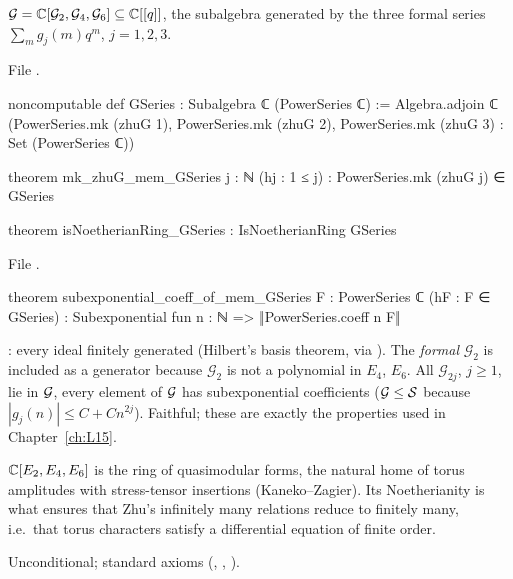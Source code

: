 \begin{definition}\label{l14:def:GSeries}
$\mathcal{G} = {\mathbb{C}}[\mathcal G_2,\mathcal G_4,\mathcal G_6]\subseteq{\mathbb{C}}[[q]]$, the subalgebra generated by the three formal
series $\sum_mg_j(m)q^m$, $j=1,2,3$.
\end{definition}
\noindent File .
\begin{leancode}
noncomputable def GSeries : Subalgebra ℂ (PowerSeries ℂ) :=
  Algebra.adjoin ℂ ({PowerSeries.mk (zhuG 1), PowerSeries.mk (zhuG 2),
    PowerSeries.mk (zhuG 3)} : Set (PowerSeries ℂ))

theorem mk_zhuG_mem_GSeries {j : ℕ} (hj : 1 ≤ j) :
    PowerSeries.mk (zhuG j) ∈ GSeries

theorem isNoetherianRing_GSeries : IsNoetherianRing GSeries
\end{leancode}
\noindent File .
\begin{leancode}
theorem subexponential_coeff_of_mem_GSeries {F : PowerSeries ℂ} (hF : F ∈ GSeries) :
    Subexponential fun n : ℕ => ‖PowerSeries.coeff n F‖
\end{leancode}
\begin{dictionary}
: every ideal finitely generated (Hilbert's basis theorem, via ). The
\emph{formal} $\mathcal G_2$ is included as a generator because $\mathcal G_2$ is not a polynomial in $E_4$, $E_6$. All
$\mathcal G_{2j}$, $j\ge1$, lie in $\mathcal{G}$, every element of $\mathcal{G}$ has subexponential coefficients
($\mathcal{G}\le\mathcal S$ because $|g_j(n)|\le C+Cn^{2j}$). Faithful; these are exactly the properties used in
Chapter~\ref{ch:L15}.
\end{dictionary}
\begin{physics}
${\mathbb{C}}[E_2,E_4,E_6]$ is the ring of quasimodular forms, the natural home of torus amplitudes with stress-tensor insertions
(Kaneko--Zagier). Its Noetherianity is what ensures that Zhu's infinitely many relations reduce to finitely many, i.e.\ that
torus characters satisfy a differential equation of finite order.
\end{physics}
\begin{status}
Unconditional; standard axioms (, ,
).
\end{status}

